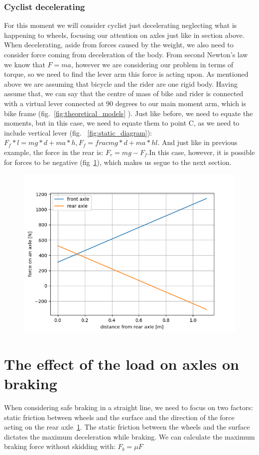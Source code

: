 \documentclass[12pt]{article}
\begin{document}
\subsubsection{Cyclist decelerating}
For this moment we will consider cyclist just decelerating neglecting what is happening to wheels, focusing
our attention on axles just like in section above. When decelerating, aside from forces caused by the weight, 
we also need to consider force coming from deceleration of the body. From second Newton's law we know that 
$F = ma$, however we are considering our problem in terms of torque, so we need to find the lever arm this
force is acting upon. As mentioned above we are assuming that bicycle and the rider are one rigid body. 
Having assume that, we can say that the centre of mass of bike and rider is connected with a virtual lever
connected at 90 degrees to our main moment arm, which is bike frame (fig.~\ref{fig:theoretical_models}
). Just like before, we need to equate the moments, but in this case, we need to 
equate them to point C, as we need to include vertical lever (fig. ~\ref{fig:static_diagram}): 
$F_f * l = mg * d + ma * h, F_f = frac{mg * d + ma * h}{l}$. And just like in previous example, 
the force in the rear is: $F_r = mg - F_f$.In this case, however, it is possible for forces to be 
negative (fig~\ref{fig:dynamic_graph}), which makes us segue to the next section.
\begin{figure}[H]
\caption{}
\includegraphics[width=\linewidth]{axles_dynamic_graph}
\label{fig:dynamic_graph}
\end{figure}

\section{The effect of the load on axles on braking}
When considering safe braking in a straight line, we need to focus on two factors: static friction between 
wheels and the surface and the direction of the force acting on the rear axle~\ref{fig:dynamic_graph}. 
The static friction between the wheels and the surface dictates the maximum deceleration while braking. We can 
calculate the maximum braking force without skidding with: $F_b = \mu F$
\end{document}
